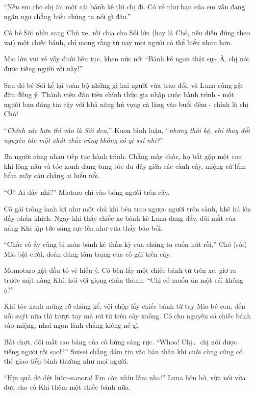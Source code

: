 \documentclass[../main.tex]{subfiles}
\begin{document}
``Nếu em cho chị ăn một cái bánh kê thì chị đi. Có vẻ như bạn của em vẫn đang ngẩn ngơ chẳng hiểu chúng ta nói gì đâu.''

Cô bé Sói nhìn sang Chủ xe, rồi chia cho Sói lớn (hay là Chó, nếu diễn đúng theo vai) một chiếc bánh, chỉ mong rằng từ nay mọi người có thể hiểu nhau hơn.

Mio lớn vui vẻ vẫy đuôi liên tục, khen nức nở: ``Bánh kê ngon thật sự\~{} À, chị nói được tiếng người rồi này!''

Sau đó bé Sói kể lại toàn bộ những gì hai người vừa trao đổi, và Luna cũng gật đầu đồng ý. Thành viên đầu tiên chính thức gia nhập cuộc hành trình - một người bạn đáng tin cậy với khả năng hú vọng cả làng vào buổi đêm - chính là chị Chó!

``\textit{Chính xác hơn thì vẫn là Sói đen,}'' Kuon bình luận, ``\textit{nhưng thôi kệ, chỉ thay đổi nguyên tác một chút chắc cũng không có gì sai nhỉ?}''

\ct

Ba người cùng nhau tiếp tục hành trình. Chẳng mấy chốc, họ bắt gặp một con khỉ lông nâu và tóc xanh đang tung tóe đu dây giữa các cành cây, miệng cứ lẩm bẩm mấy câu chẳng ai hiểu nổi.

``Ơ? Ai đấy nhỉ?'' Miotaro chỉ vào bóng người trên cây.

Cô gái trông lanh lợi như một chú khỉ bèn treo ngược người trên cành, khẽ hú lên đầy phấn khích. Ngay khi thấy chiếc xe bánh kê Luna đang đẩy, đôi mắt của nàng Khỉ lập tức sáng rực lên như vừa thấy bảo bối.

``Chắc cô ấy cũng bị món bánh kê thần kỳ của chúng ta cuốn hút rồi,'' Chó (sói) Mio bật cười, đoán đúng tâm trạng của cô gái trên cây.

Momotaro gật đầu tỏ vẻ hiểu ý. Cô bèn lấy một chiếc bánh từ trên xe, giơ ra trước mặt nàng Khỉ, hỏi với giọng chân thành: ``Chị có muốn ăn một cái không ạ?''

Khỉ tóc xanh mừng rỡ chẳng kể, vội chộp lấy chiếc bánh từ tay Mio bé con, đến nỗi suýt nữa thì trượt tay mà rơi từ trên cây xuống. Cô cho nguyên cả chiếc bánh vào miệng, nhai ngon lành chẳng kiêng nể gì.

Bất chợt, đôi mắt sao băng của cô bừng sáng rực. ``Whoa! Chị\dots\ chị nói được tiếng người rồi sao!?'' Suisei chẳng dám tin vào bản thân khi cuối cùng cũng có thể giao tiếp bình thường như mọi người.

``Hịu quả dõ dệt luôn-nanora! Em còn nhìu lắm nha!'' Luna hớn hở, vừa nói vừa đưa cho cô Khỉ thêm một chiếc bánh nữa.
\end{document}
